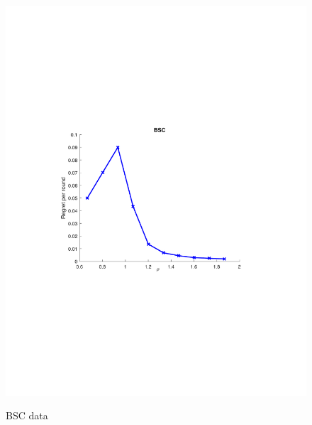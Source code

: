 \begin{figure}[!bt]
\begin{minipage}{4cm}
		\includegraphics[scale=0.3]{../Simulations/Figures/BSC_WD1}
		\label{fig:BSC_WD}
		\vspace{-1cm}
		\caption{BSC data}
	\end{minipage}
	\begin{minipage}{4cm}
		\centering

\end{minipage}
\end{figure}
